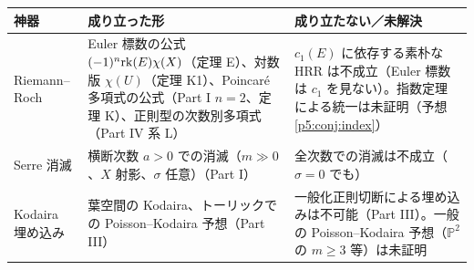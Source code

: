 \begin{center}\small
\begin{tabular}{>{\raggedright\arraybackslash}p{2.6cm}>{\raggedright\arraybackslash}p{6.2cm}>{\raggedright\arraybackslash}p{6.0cm}}
\toprule 神器 & 成り立った形 & 成り立たない／未解決\\\midrule
Riemann--Roch & Euler 標数の公式 $(-1)^n\mathrm{rk}(E)\chi(X)$（定理 E）、対数版 $\chi(U)$（定理 K1）、Poincar\'e 多項式の公式（Part I $n=2$、定理 K）、正則型の次数別多項式（Part IV 系 L） & $c_1(E)$ に依存する素朴な HRR は不成立（Euler 標数は $c_1$ を見ない）。指数定理による統一は未証明（予想 \ref{p5:conj:index}）\\\midrule
Serre 消滅 & 横断次数 $a>0$ での消滅（$m\gg0$、$X$ 射影、$\sigma$ 任意）（Part I） & 全次数での消滅は不成立（$\sigma=0$ でも）\\\midrule
Kodaira 埋め込み & 葉空間の Kodaira、トーリックでの Poisson--Kodaira 予想（Part III） & 一般化正則切断による埋め込みは不可能（Part III）。一般の Poisson--Kodaira 予想（$\mathbb P^2$ の $m\ge3$ 等）は未証明\\\bottomrule
\end{tabular}
\end{center}

